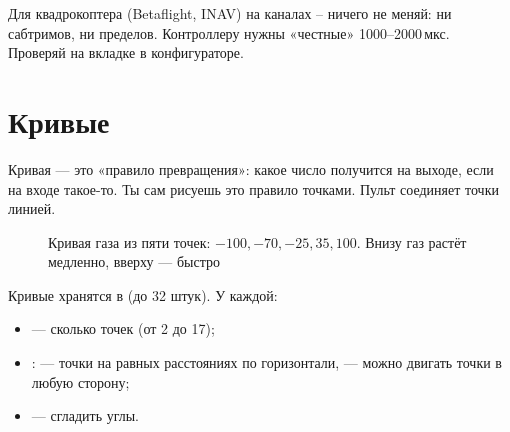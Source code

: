 \begin{caution}
Для квадрокоптера (Betaflight, INAV) на каналах -- ничего не меняй: ни
сабтримов, ни пределов. Контроллеру нужны «честные» 1000--2000\,мкс. Проверяй на вкладке
 в конфигураторе.
\end{caution}

\section{Кривые}

\begin{simple}
Кривая --- это «правило превращения»: какое число получится на выходе, если на входе
такое-то. Ты сам рисуешь это правило точками. Пульт соединяет точки линией.
\end{simple}

\begin{figure}[H]
\centering
{}
\caption{Кривая газа из пяти точек: $-100, -70, -25, 35, 100$. Внизу газ растёт медленно,
вверху --- быстро}
\end{figure}

Кривые хранятся в  (до 32 штук). У каждой:
\begin{itemize}
  \item {} --- сколько точек (от 2 до 17);
  \item {}:  --- точки на равных расстояниях по горизонтали,
         --- можно двигать точки в любую сторону;
  \item {} --- сгладить углы.
\end{itemize}

